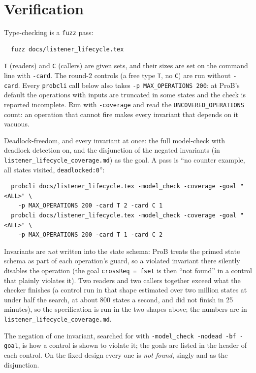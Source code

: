 \documentclass[a4paper,10pt,fleqn]{article}
\begin{document}
\section{Verification}
\label{sec:verify}

Type-checking is a \texttt{fuzz} pass:
\begin{verbatim}
  fuzz docs/listener_lifecycle.tex
\end{verbatim}

\texttt{T} (readers) and \texttt{C} (callers) are given sets, and their sizes
are set on the command line with \texttt{-card}.  The round-2 controls (a free
type \texttt{T}, no \texttt{C}) are run without \texttt{-card}.  Every
\texttt{probcli} call below also takes \texttt{-p MAX\_OPERATIONS 200}: at
ProB's default the operations with inputs are truncated in some states and the
check is reported incomplete.  Run with \texttt{-coverage} and read the
\texttt{UNCOVERED\_OPERATIONS} count: an operation that cannot fire makes every
invariant that depends on it vacuous.

Deadlock-freedom, and every invariant at once: the full model-check with
deadlock detection on, and the disjunction of the negated invariants (in
\texttt{listener\_lifecycle\_coverage.md}) as the goal.  A pass is ``no
counter example, all states visited, \texttt{deadlocked:0}'':
\begin{verbatim}
  probcli docs/listener_lifecycle.tex -model_check -coverage -goal "<ALL>" \
    -p MAX_OPERATIONS 200 -card T 2 -card C 1
  probcli docs/listener_lifecycle.tex -model_check -coverage -goal "<ALL>" \
    -p MAX_OPERATIONS 200 -card T 1 -card C 2
\end{verbatim}
Invariants are \emph{not} written into the state schema: ProB treats the
primed state schema as part of each operation's guard, so a violated
invariant there silently disables the operation (the goal \texttt{crossReq =
fset} is then ``not found'' in a control that plainly violates it).
Two readers and two callers together exceed what the checker finishes (a
control run in that shape estimated over two million states at under half the
search, at about 800 states a second, and did not finish in 25 minutes), so the
specification is run in the two shapes above; the numbers are in
\texttt{listener\_lifecycle\_coverage.md}.

The negation of one invariant, searched for with
\texttt{-model\_check -nodead -bf -goal}, is how a control is shown to
violate it; the goals are listed in the header of each control.  On the fixed
design every one is \emph{not found}, singly and as the disjunction.
\end{document}
